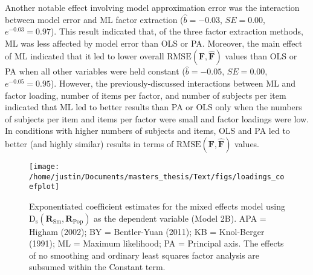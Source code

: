 \documentclass[
  english,
  man]{apa6}
\begin{document}
Another notable effect involving model approximation error was the interaction between model error and ML factor extraction (\(\hat{b} = -0.03\), \(SE = 0.00\), \(e^{-0.03} = 0.97\)). This result indicated that, of the three factor extraction methods, ML was less affected by model error than OLS or PA. Moreover, the main effect of ML indicated that it led to lower overall \(\textrm{RMSE}(\mathbf{F}, \hat{\mathbf{F}})\) values than OLS or PA when all other variables were held constant (\(\hat{b} = -0.05\), \(SE = 0.00\), \(e^{-0.05} = 0.95\)). However, the previously-discussed interactions between ML and factor loading, number of items per factor, and number of subjects per item indicated that ML led to better results than PA or OLS only when the numbers of subjects per item and items per factor were small and factor loadings were low. In conditions with higher numbers of subjects and items, OLS and PA led to better (and highly similar) results in terms of \(\textrm{RMSE}(\mathbf{F}, \hat{\mathbf{F}})\) values.

\begin{figure}

{\centering \texttt{[image: /home/justin/Documents/masters\_thesis/Text/figs/loadings\_coefplot]} 

}

\caption{Exponentiated coefficient estimates for the mixed effects model using $\mathrm{D}_{\mathrm{s}}(\mathbf{R}_{\textrm{Sm}}, \mathbf{R}_{\textrm{Pop}})$ as the dependent variable (Model 2B). APA = Higham (2002); BY = Bentler-Yuan (2011); KB = Knol-Berger (1991); ML = Maximum likelihood; PA = Principal axis. The effects of no smoothing and ordinary least squares factor analysis are subsumed within the Constant term.}\label{fig:coefplot-loading-recovery}
\end{figure}
\end{document}
